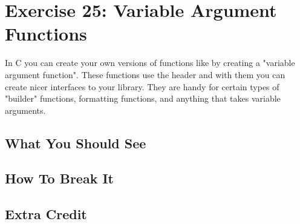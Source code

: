 \chapter{Exercise 25: Variable Argument Functions}

In C you can create your own versions of functions like  by
creating a "variable argument function".  These functions use the header
 and with them you can create nicer interfaces to your
library.  They are handy for certain types of "builder" functions, formatting
functions, and anything that takes variable arguments.


\section{What You Should See}


\section{How To Break It}


\section{Extra Credit}



